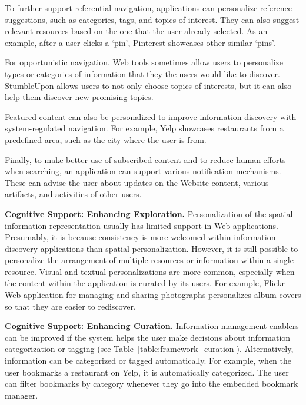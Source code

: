 \documentclass[review]{elsarticle}
\newcommand{\feature}[1]{{\ttfamily#1}}
\begin{document}
{{{To further support referential navigation, applications can \feature{personalize} reference suggestions, such as \feature{categories}, \feature{tags}, and \feature{topics} of interest. They can also suggest relevant resources based on the one that the user already selected. As an example, after a user clicks a `pin', Pinterest showcases other similar `pins'.

For opportunistic navigation, Web tools sometimes allow users to \feature{personalize} types or categories of information that they the users would like to discover. StumbleUpon allows users to not only choose topics of interests, but it can also help them discover new promising topics.


Featured content can also be \feature{personalized} to improve information discovery with system-regulated navigation. For example, Yelp showcases restaurants from a predefined area, such as the city where the user is from.

Finally, to make better use of subscribed content and to reduce human efforts when searching, an application can support various \feature{notification mechanisms}. These can advise the user about updates on the \feature{Website content}, various \feature{artifacts}, and activities of other \feature{users}.  

} %
{\textbf{Cognitive Support: Enhancing Exploration.}
\feature{Personalization} of the \feature{spatial} information representation usually has limited support in Web applications. Presumably, it is because consistency is more welcomed within information discovery applications than spatial personalization. However, it is still possible to personalize the arrangement of multiple resources or information within a single resource. 
%
\feature{Visual} and \feature{textual personalizations} are more common, especially when the content within the application is curated by its users.  For example, Flickr Web application for managing and sharing photographs personalizes album covers so that they are easier to rediscover. 


{\textbf{Cognitive Support: Enhancing Curation.}
Information management enablers can be improved if the system helps the user make decisions about information categorization or tagging (see Table~\ref{table:framework_curation}). Alternatively, information can be \feature{categorized} or \feature{tagged automatically}. For example, when the user bookmarks a restaurant on Yelp, it is automatically categorized. The user can filter bookmarks by category whenever they go into the embedded bookmark manager. 

}}}}
\end{document}
